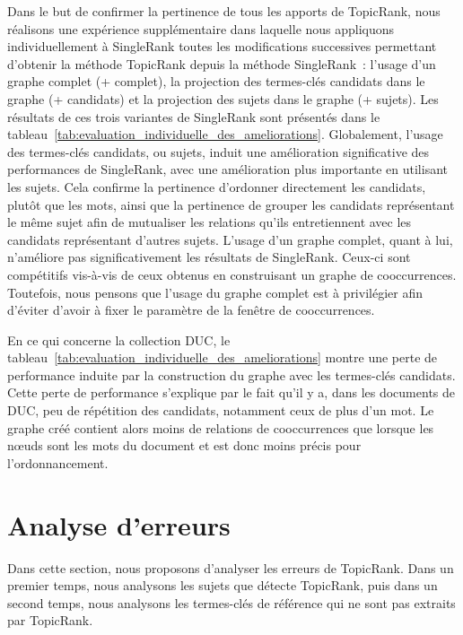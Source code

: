         Dans le but de confirmer la pertinence de tous les apports de TopicRank,
        nous réalisons une expérience supplémentaire dans laquelle nous
        appliquons individuellement à SingleRank toutes les modifications
        successives permettant d'obtenir la méthode TopicRank depuis la méthode
        SingleRank~: l'usage d'un graphe complet (+ complet), la projection des
        termes-clés candidats dans le graphe (+ candidats) et la projection des
        sujets dans le graphe (+ sujets). Les résultats de ces trois variantes
        de SingleRank sont présentés dans le
        tableau~\ref{tab:evaluation_individuelle_des_ameliorations}.
        Globalement, l'usage des termes-clés candidats, ou sujets, induit une
        amélioration significative des performances de SingleRank, avec une
        amélioration plus importante en utilisant les sujets. Cela confirme la
        pertinence d'ordonner directement les candidats, plutôt que les mots,
        ainsi que la pertinence de grouper les candidats représentant le même
        sujet afin de mutualiser les relations qu'ils entretiennent avec les
        candidats représentant d'autres sujets. L'usage d'un graphe complet,
        quant à lui, n'améliore pas significativement les résultats de
        SingleRank. Ceux-ci sont compétitifs vis-à-vis de ceux obtenus en
        construisant un graphe de cooccurrences. Toutefois, nous pensons que
        l'usage du graphe complet est à privilégier afin d'éviter d'avoir à
        fixer le paramètre de la fenêtre de cooccurrences.
        
        En ce qui concerne la collection DUC, le
        tableau~\ref{tab:evaluation_individuelle_des_ameliorations} montre une
        perte de performance induite par la construction du graphe avec les
        termes-clés candidats. Cette perte de performance s'explique par le fait
        qu'il y a, dans les documents de DUC, peu de répétition des candidats,
        notamment ceux de plus d'un mot. Le graphe créé contient alors moins de
        relations de cooccurrences que lorsque les n\oe{}uds sont les mots du
        document et est donc moins précis pour l'ordonnancement.

      \section{Analyse d'erreurs}
      \label{sec:main-automatic_keyphrase_annotation-unsupervised_automatic_keyphrase_extraction-error_analysis-}
        Dans cette section, nous proposons d'analyser les erreurs de TopicRank.
        Dans un premier temps, nous analysons les sujets que détecte TopicRank,
        puis dans un second temps, nous analysons les termes-clés de référence
        qui ne sont pas extraits par Topic\-Rank.

